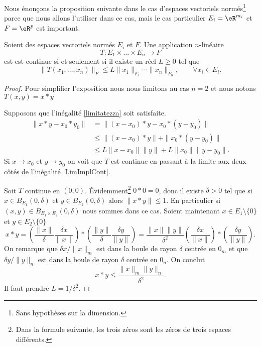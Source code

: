 Nous énonçons la proposition suivante dans le cas d'espaces vectoriels normés\footnote{Sans hypothèses sur la dimension.} parce que nous allons l'utiliser dans ce cas, mais le cas particulier \( E_i=\eR^{m_i}\) et \( F=\eR^p\) est important.
\begin{proposition} \label{PropUADlSMg}
    Soient des espaces vectoriels normés \( E_i\) et \( F\). Une application \( n\)-linéaire
    \begin{equation}
        T\colon E_1\times\ldots\times E_n\to F
    \end{equation}
    est est continue si et seulement si il existe un réel $L\geq 0$ tel que
  \begin{equation}\label{limitatezza}
     \|T(x_1, \ldots,x_n)\|_F\leq L \|x_1\|_{F_1}\cdots\|x_n\|_{F_n}, \qquad \forall x_i\in E_i.
  \end{equation}
\end{proposition}

\begin{proof}
    Pour simplifier l'exposition nous nous limitons au cas $n=2$ et nous notons $T(x,y)=x*y$

    Supposons que l'inégalité \eqref{limitatezza} soit satisfaite.
    \begin{equation}\label{LimImplCont}
      \begin{aligned}
        \|x*y-x_0*y_0\|&=\|(x-x_0)*y-x_0*(y-y_0)\|\\
    &\leq \|(x-x_0)*y\|+\|x_0*(y-y_0)\|\\
    &\leq L\|x-x_0\|\|y\| + L\|x_0\|\|y-y_0\|.
      \end{aligned}
    \end{equation}
    Si $x\to x_0$ et $y\to y_0$  on voit que $T$ est continue en passant à la limite aux deux côtés de l'inégalité \eqref{LimImplCont}.

    Soit $T$ continue en $(0,0)$. Évidemment\footnote{Dans la formule suivante, les trois zéros sont les zéros de trois espaces différents.} $0*0=0$, donc il existe $\delta>0$ tel que si $x\in B_{E_1}(0,\delta)$ et $y\in B_{E_2}(0,\delta)$ alors $\|x*y\|\leq 1$. En particulier si \( (x,y)\in B_{E_1\times E_2}(0,\delta)\) nous sommes dans ce cas. Soient maintenant  $x\in E_1\setminus\{ 0 \}$  et $y\in E_2\setminus\{ 0\}$
    \begin{equation}
        x*y=\left(\frac{\|x\|}{\delta}\frac{\delta x}{\|x\|}\right)*\left(\frac{\|y\|}{\delta}\frac{\delta y}{\|y\|}\right)
    =\frac{\|x\|\|y\|}{\delta^2} \left(\frac{\delta x}{\|x\|}\right)*\left(\frac{\delta y}{\|y\|}\right).
     \end{equation}
    On remarque que $\delta x/\|x\|_m$ est dans la boule de rayon $\delta$ centrée en $0_m$ et que $\delta y/\|y\|_n$ est dans la boule de rayon $\delta$ centrée en $0_n$. On conclut
    \[
     x*y\leq \frac{\|x\|_m\|y\|_n}{\delta^2}.
    \]
    Il faut prendre $L=1/\delta^2$.
\end{proof}

